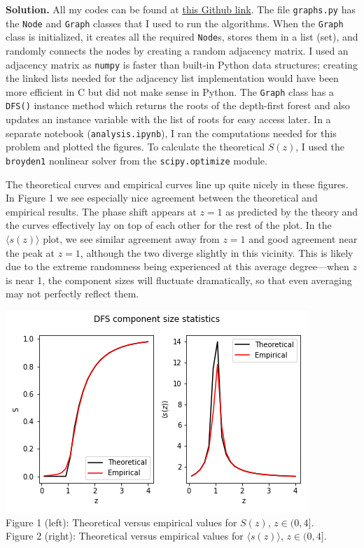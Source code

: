 \documentclass{letter}
\newcounter{problem}
\newcommand{\Solution}[1]{%
	\textbf{Solution.} #1 \par%
}
\begin{document}
    \Solution{All my codes can be found at \href{https://github.com/thoffman1/amsc808n/tree/master/hws/hw6}{this Github link}. The file \texttt{graphs.py} has the \texttt{Node} and \texttt{Graph} classes that I used to run the algorithms. When the \texttt{Graph} class is initialized, it creates all the required \texttt{Node}s, stores them in a list (set), and randomly connects the nodes by creating a random adjacency matrix. I used an adjacency matrix as \texttt{numpy} is faster than built-in Python data structures; creating the linked lists needed for the adjacency list implementation would have been more efficient in C but did not make sense in Python. The \texttt{Graph} class has a \texttt{DFS()} instance method which returns the roots of the depth-first forest and also updates an instance variable with the list of roots for easy access later. In a separate notebook (\texttt{analysis.ipynb}), I ran the computations needed for this problem and plotted the figures. To calculate the theoretical $S(z)$, I used the \texttt{broyden1} nonlinear solver from the \texttt{scipy.optimize} module.

    The theoretical curves and empirical curves line up quite nicely in these figures. In Figure 1 we see especially nice agreement between the theoretical and empirical results. The phase shift appears at $z = 1$ as predicted by the theory and the curves effectively lay on top of each other for the rest of the plot. In the $\langle s(z) \rangle$ plot, we see similar agreement away from $z = 1$ and good agreement near the peak at $z = 1$, although the two diverge slightly in this vicinity. This is likely due to the extreme randomness being experienced at this average degree---when $z$ is near 1, the component sizes will fluctuate dramatically, so that even averaging may not perfectly reflect them.

    \begin{center} 
        \includegraphics{../code/dfsstats.png} \\
        Figure 1 (left): Theoretical versus empirical values for $S(z)$, $z \in (0, 4]$. \\
        Figure 2 (right): Theoretical versus empirical values for $\langle s(z) \rangle$, $z \in (0, 4]$.
    \end{center}}
\end{document}
